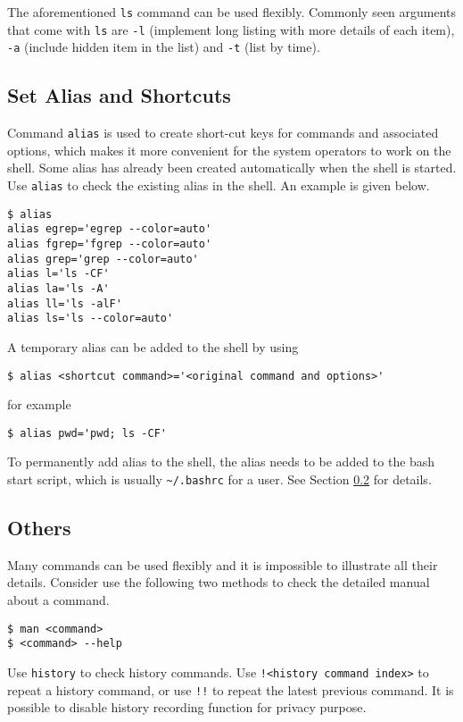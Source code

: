 The aforementioned \verb|ls| command can be used flexibly. Commonly seen arguments that come with \verb|ls| are \verb|-l| (implement long listing with more details of each item), \verb|-a| (include hidden item in the list) and \verb|-t| (list by time).

\subsection{Set Alias and Shortcuts}

Command \verb|alias| is used to create short-cut keys for commands and associated options, which makes it more convenient for the system operators to work on the shell. Some alias has already been created automatically when the shell is started. Use \verb|alias| to check the existing alias in the shell. An example is given below.

\begin{lstlisting}
$ alias
alias egrep='egrep --color=auto'
alias fgrep='fgrep --color=auto'
alias grep='grep --color=auto'
alias l='ls -CF'
alias la='ls -A'
alias ll='ls -alF'
alias ls='ls --color=auto'
\end{lstlisting}

A temporary alias can be added to the shell by using
\begin{lstlisting}
$ alias <shortcut command>='<original command and options>'
\end{lstlisting}
for example
\begin{lstlisting}
$ alias pwd='pwd; ls -CF'
\end{lstlisting}

To permanently add alias to the shell, the alias needs to be added to the bash start script, which is usually \verb|~/.bashrc| for a user. See Section \ref{ch2subsec:others} for details.

\subsection{Others}\label{ch2subsec:others}

Many commands can be used flexibly and it is impossible to illustrate all their details. Consider use the following two methods to check the detailed manual about a command.
\begin{lstlisting}
$ man <command>
$ <command> --help
\end{lstlisting}

Use \verb|history| to check history commands. Use \verb|!<history command index>| to repeat a history command, or use \verb|!!| to repeat the latest previous command. It is possible to disable history recording function for privacy purpose.

